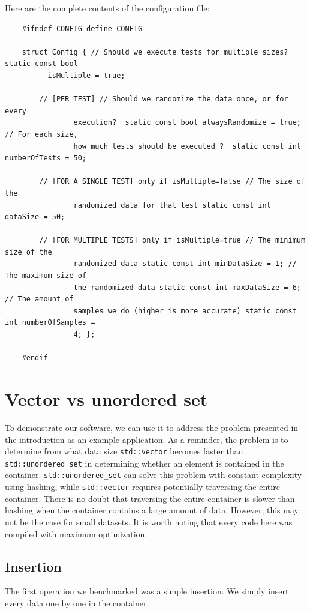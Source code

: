 \documentclass[conference]{IEEEtran} \IEEEoverridecommandlockouts \usepackage{graphicx}
\def\code#1{\texttt{#1}}
\begin{document}
Here are the complete contents of the configuration file:
\begin{lstlisting}
	#ifndef CONFIG define CONFIG
	
	struct Config { // Should we execute tests for multiple sizes?  static const bool
          isMultiple = true;
		
		// [PER TEST] // Should we randomize the data once, or for every
                execution?  static const bool alwaysRandomize = true; // For each size,
                how much tests should be executed ?  static const int numberOfTests = 50;
		
		// [FOR A SINGLE TEST] only if isMultiple=false // The size of the
                randomized data for that test static const int dataSize = 50;
		
		// [FOR MULTIPLE TESTS] only if isMultiple=true // The minimum size of the
                randomized data static const int minDataSize = 1; // The maximum size of
                the randomized data static const int maxDataSize = 6; // The amount of
                samples we do (higher is more accurate) static const int numberOfSamples =
                4; };
	
	#endif
\end{lstlisting}

\section{Vector vs unordered set}

To demonstrate our software, we can use it to address the problem presented in the
introduction as an example application. As a reminder, the problem is to determine from
what data size \code{std::vector} becomes faster than \code{std::unordered\_set} in
determining whether an element is contained in the container. \code{std::unordered\_set}
can solve this problem with constant complexity using hashing, while \code{std::vector}
requires potentially traversing the entire container. There is no doubt that traversing
the entire container is slower than hashing when the container contains a large amount of
data. However, this may not be the case for small datasets. It is worth noting that every
code here was compiled with maximum optimization.

\subsection{Insertion}

The first operation we benchmarked was a simple insertion. We simply insert every data one
by one in the container.
\end{document}
